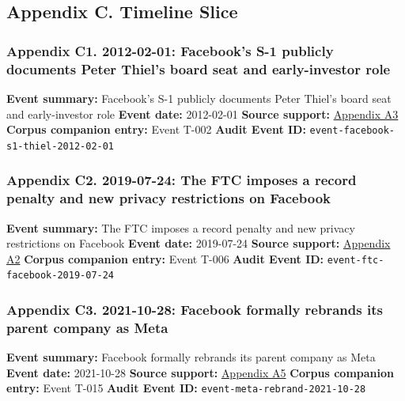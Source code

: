 \documentclass[
  american,
  11pt,
  letterpaper,
]{article}
\begin{document}
\subsection{Appendix C. Timeline
Slice}\label{appendix-c.-timeline-slice}

\subsubsection{Appendix C1. 2012-02-01: Facebook's S-1 publicly
documents Peter Thiel's board seat and early-investor
role}\label{appendix-c1-2012-02-01-facebook-s-s-1-publicly-documents-peter-thiel-s-board-seat-and-early-investor-role}

\textbf{Event summary:} Facebook's S-1 publicly documents Peter Thiel's
board seat and early-investor role \textbf{Event date:} 2012-02-01
\textbf{Source support:}
\hyperref[appendix-a3-facebook-inc-registration-statement-on-form-s-1]{Appendix
A3} \textbf{Corpus companion entry:} Event T-002 \textbf{Audit Event
ID:} \texttt{event-facebook-s1-thiel-2012-02-01}

\subsubsection{Appendix C2. 2019-07-24: The FTC imposes a record penalty
and new privacy restrictions on
Facebook}\label{appendix-c2-2019-07-24-the-ftc-imposes-a-record-penalty-and-new-privacy-restrictions-on-facebook}

\textbf{Event summary:} The FTC imposes a record penalty and new privacy
restrictions on Facebook \textbf{Event date:} 2019-07-24 \textbf{Source
support:}
\hyperref[appendix-a2-ftc-imposes-5-billion-penalty-and-sweeping-new-privacy-restrictions-on-facebook]{Appendix
A2} \textbf{Corpus companion entry:} Event T-006 \textbf{Audit Event
ID:} \texttt{event-ftc-facebook-2019-07-24}

\subsubsection{Appendix C3. 2021-10-28: Facebook formally rebrands its
parent company as
Meta}\label{appendix-c3-2021-10-28-facebook-formally-rebrands-its-parent-company-as-meta}

\textbf{Event summary:} Facebook formally rebrands its parent company as
Meta \textbf{Event date:} 2021-10-28 \textbf{Source support:}
\hyperref[appendix-a5-the-facebook-company-is-now-meta]{Appendix A5}
\textbf{Corpus companion entry:} Event T-015 \textbf{Audit Event ID:}
\texttt{event-meta-rebrand-2021-10-28}
\end{document}
